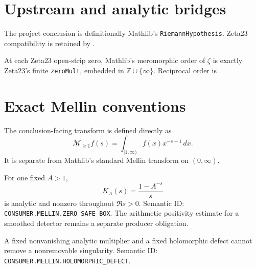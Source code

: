 
\section{Upstream and analytic bridges}

\begin{theorem}
\label{thm:A-rh-bridge}
The project conclusion is definitionally Mathlib's
\texttt{RiemannHypothesis}.  Zeta23 compatibility is retained by
.
\end{theorem}

\begin{theorem}
\label{thm:A-zero-multiplicity}
At each Zeta23 open-strip zero, Mathlib's meromorphic order of
\(\zeta\) is exactly Zeta23's finite \texttt{zeroMult}, embedded in
\(\mathbb Z\cup\{\infty\}\).  Reciprocal order is
.
\end{theorem}

\section{Exact Mellin conventions}

\begin{definition}
\label{def:A-tail-mellin}
The conclusion-facing transform is defined directly as
\[
  \mathcal M_{\geq 1}f(s)
  =\int_{[1,\infty)} f(x)x^{-s-1}\,dx.
\]
It is separate from Mathlib's standard Mellin transform on
\((0,\infty)\).
\end{definition}

\begin{theorem}
\label{thm:A-log-box}
For one fixed \(A>1\),
\[
  K_A(s)=\frac{1-A^{-s}}{s}
\]
is analytic and nonzero throughout \(\Re s>0\).
Semantic ID: \texttt{CONSUMER.MELLIN.ZERO\_SAFE\_BOX}.
The arithmetic positivity estimate for a smoothed detector remains a
separate producer obligation.
\end{theorem}

\begin{theorem}
\label{thm:A-defect-transfer}
A fixed nonvanishing analytic multiplier and a fixed holomorphic defect
cannot remove a nonremovable singularity.
Semantic ID: \texttt{CONSUMER.MELLIN.HOLOMORPHIC\_DEFECT}.
\end{theorem}

